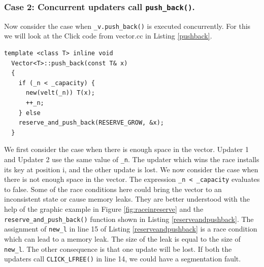 \documentclass[a4paper,marginparwidth=50pt,marginparsep=10pt]{article}
\begin{document}
\subsubsection{Case 2: Concurrent updaters call \texttt{push\_back()}. }
Now consider the case when \texttt{\_v.push\_back()} is executed concurrently. For this we will look at the Click code from vector.cc in Listing \ref{pushback}.
\begin{lstlisting}[caption = The push\_back() function, label=pushback]
  template <class T> inline void
  Vector<T>::push_back(const T& x)
  {
    if (_n < _capacity) {
      new(velt(_n)) T(x);
      ++_n;
    } else
    reserve_and_push_back(RESERVE_GROW, &x);
  }
\end{lstlisting}
We first consider the case when there is enough space in the vector. Updater 1 and Updater 2 use the same value of \verb+_n+. The updater which wins the race installs its key at position i, and the other update is lost.
We now consider the case when there is not enough space in the vector. The expression \verb$_n < _capacity$ evaluates to false. Some of the race conditions here could bring the vector to an inconsistent state or cause memory leaks. They are better understood with the help of the graphic example in Figure \ref{fig:raceinreserve} and the \texttt{reserve\_and\_push\_back()} function shown in Listing \ref{reserveandpushback}. The assignment of \verb+new_l+ in line 15 of Listing \ref{reserveandpushback} is a race condition which can lead to a memory leak. The size of the leak is equal to the size of \verb+new_l+. The other consequence is that one update will be lost. If both the updaters call \texttt{CLICK\_LFREE()} in line 14, we could have a segmentation fault.
\end{document}
